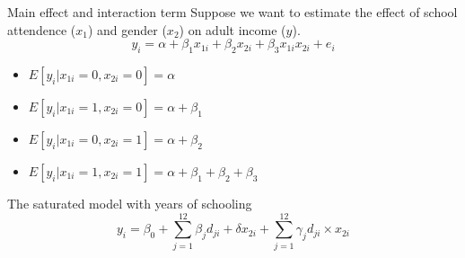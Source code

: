 \documentclass{beamer}
\begin{document}
\begin{frame}{Main effect and interaction term}
Suppose we want to estimate the effect of school attendence ($x_1$) and gender ($x_2$) on adult income ($y$).
\[y_i=\alpha+\beta_1 x_{1i}+\beta_2 x_{2i}+\beta_3 x_{1i}x_{2i}+e_i \]
\begin{itemize}
\item $E[y_i|x_{1i}=0,x_{2i}=0]=\alpha $
\item $E[y_i|x_{1i}=1,x_{2i}=0]=\alpha+\beta_1 $
\item $E[y_i|x_{1i}=0,x_{2i}=1]=\alpha+\beta_2 $
\item $E[y_i|x_{1i}=1,x_{2i}=1]=\alpha+\beta_1+\beta_2+\beta_3 $
\end{itemize}\medskip\pause

The saturated model with years of schooling
\[y_i=\beta_0+\sum_{j=1}^{12} \beta_j d_{ji}+\delta x_{2i}+\sum_{j=1}^{12}\gamma_j d_{ji}\times x_{2i} \]
\end{frame}
\end{document}
